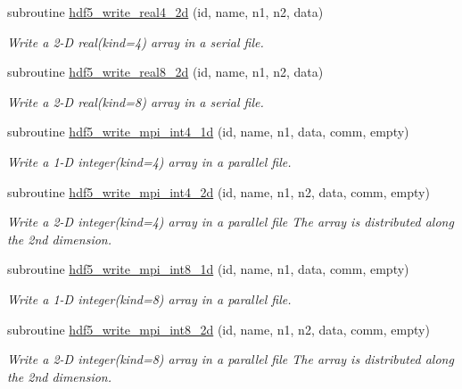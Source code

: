 \begin{DoxyCompactItemize}
subroutine \hyperlink{classmodhdf5_a71a612d3c6bc8959576fe46d7bab679f}{hdf5\-\_\-write\-\_\-real4\-\_\-2d} (id, name, n1, n2, data)
\begin{DoxyCompactList}\small\item\em Write a 2-\/\-D real(kind=4) array in a serial file. \end{DoxyCompactList}\item 
subroutine \hyperlink{classmodhdf5_a86d263896481bcb679282cede10ab4a1}{hdf5\-\_\-write\-\_\-real8\-\_\-2d} (id, name, n1, n2, data)
\begin{DoxyCompactList}\small\item\em Write a 2-\/\-D real(kind=8) array in a serial file. \end{DoxyCompactList}\item 
subroutine \hyperlink{classmodhdf5_af38c097f92a373ed47962ec1e02f4cb3}{hdf5\-\_\-write\-\_\-mpi\-\_\-int4\-\_\-1d} (id, name, n1, data, comm, empty)
\begin{DoxyCompactList}\small\item\em Write a 1-\/\-D integer(kind=4) array in a parallel file. \end{DoxyCompactList}\item 
subroutine \hyperlink{classmodhdf5_a727abaf04f522d9a2a2accdbf3512a96}{hdf5\-\_\-write\-\_\-mpi\-\_\-int4\-\_\-2d} (id, name, n1, n2, data, comm, empty)
\begin{DoxyCompactList}\small\item\em Write a 2-\/\-D integer(kind=4) array in a parallel file The array is distributed along the 2nd dimension. \end{DoxyCompactList}\item 
subroutine \hyperlink{classmodhdf5_a3402bae4c5e2b0e315c1728b264798da}{hdf5\-\_\-write\-\_\-mpi\-\_\-int8\-\_\-1d} (id, name, n1, data, comm, empty)
\begin{DoxyCompactList}\small\item\em Write a 1-\/\-D integer(kind=8) array in a parallel file. \end{DoxyCompactList}\item 
subroutine \hyperlink{classmodhdf5_a2ca2e47f5fe959ef8cbf3bdad5bef7f8}{hdf5\-\_\-write\-\_\-mpi\-\_\-int8\-\_\-2d} (id, name, n1, n2, data, comm, empty)
\begin{DoxyCompactList}\small\item\em Write a 2-\/\-D integer(kind=8) array in a parallel file The array is distributed along the 2nd dimension. \end{DoxyCompactList}\item 

\end{DoxyCompactItemize}
